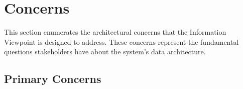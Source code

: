 \documentclass[11pt,letterpaper]{article}
\begin{document}
\section{Concerns}

This section enumerates the architectural concerns that the Information Viewpoint is designed to address. These concerns represent the fundamental questions stakeholders have about the system's data architecture.

\subsection{Primary Concerns}
\end{document}
